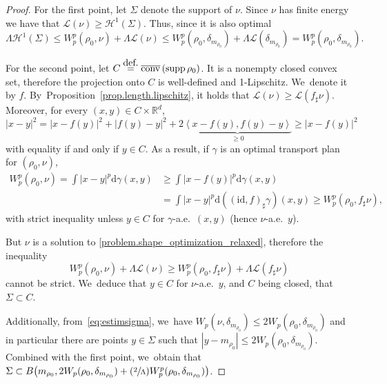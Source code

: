 \documentclass[11pt]{article}
\numberwithin{equation}{section}
\newcommand{\Psfrac}[2]{(\sfrac{#1}{#2})}
\theoremstyle{definition}
\newcommand{\eqdef}{\ensuremath{\stackrel{\mbox{\upshape\tiny def.}}{=}}}
\newcommand\cH{\mathcal{H}}
\newcommand\cL{\mathcal{L}}
\newcommand{\RR}{\mathbb{R}}
\DeclareMathOperator{\supp}{supp}
\DeclareMathOperator{\conv}{conv}
\newcommand{\cconv}{\overline{\conv}}
\newcommand\dd{\mathrm{d}}
\newcommand{\abs}[1]{\left\lvert#1\right\rvert}
\begin{document}
\begin{proof}
For the first point, let $\Sigma$ denote the support of $\nu$. Since $\nu$ has finite energy we have that $\mathcal{L}(\nu) \geq \cH^1(\Sigma)$. Thus, since it is also optimal
\begin{equation}\label{eq:estimsigma}
\Lambda \cH^1(\Sigma)
\leq
W^p_p(\rho_0,\nu)+\Lambda \mathcal{L}(\nu) \le
W^p_p(\rho_0,\delta_{m_{\rho_0}})+\Lambda \cL(\delta_{m_{\rho_0}}) = W^p_p(\rho_0,\delta_{m_{\rho_0}}).
\end{equation}

For the second point, let $C\eqdef \cconv\left(\supp \rho_0\right)$. It is a nonempty closed convex set, therefore the projection onto $C$ is well-defined and 1-Lipschitz. We~denote it by $f$. By~Proposition~\ref{prop.length.lipschitz}, it holds that $\cL(\nu)\geq \cL(f_\sharp \nu)$. Moreover, for every $(x,y)\in C\times \RR^d$,
\begin{equation*}
\abs{x-y}^2 =\abs{x-f(y)}^2 + \abs{f(y)-y}^2 +2\underbrace{\left\langle{x-f(y)},{f(y)-y}\right\rangle}_{\geq 0}\geq \abs{x-f(y)}^2
\end{equation*}
with equality if and only if $y \in C$. As a result, if $\gamma$ is an optimal transport plan for $(\rho_0,\nu)$,
\begin{align*}
W_p^p(\rho_0,\nu)= \int \abs{x-y}^p\dd \gamma(x,y) &\geq \int \abs{x-f(y)}^p\dd \gamma(x,y) \\
&=\int \abs{x-y}^p\dd\left((\text{id},f)_\sharp \gamma\right)(x,y) \geq W_p^p(\rho_0,f_\sharp\nu),
\end{align*}
with strict inequality unless $y \in C$ for $\gamma$-a.e.\ $(x,y)$ (hence $\nu$-a.e.\ $y$).

But $\nu$ is a solution to \eqref{problem.shape_optimization_relaxed}, therefore the inequality
\begin{equation*}
W_p^p(\rho_0,\nu)+ \Lambda \cL(\nu)\geq W_p^p(\rho_0,f_\sharp\nu)+ \Lambda \cL(f_\sharp \nu)
\end{equation*}
cannot be strict. We~deduce that $y \in C$ for $\nu$-a.e.\ $y$, and $C$ being closed, that $\Sigma \subset C$.

Additionally, from~\eqref{eq:estimsigma}, we~have
$W_p(\nu,\delta_{m_{\rho_0}})\le 2 W_p(\rho_0,\delta_{m_{\rho_0}})$ and
in particular there are points $y\in \Sigma$ such that
$|y-m_{\rho_0}|\le 2 W_p(\rho_0,\delta_{m_{\rho_0}})$. Combined
with the first point, we~obtain that $\Sigma\subset
B\big({m_{\rho_0}},2W_p(\rho_0,\delta_{m_{\rho_0}})
+ \Psfrac{2}{\Lambda}W_p^p(\rho_0,\delta_{m_{\rho_0}})\big)$.
\end{proof}
\end{document}
